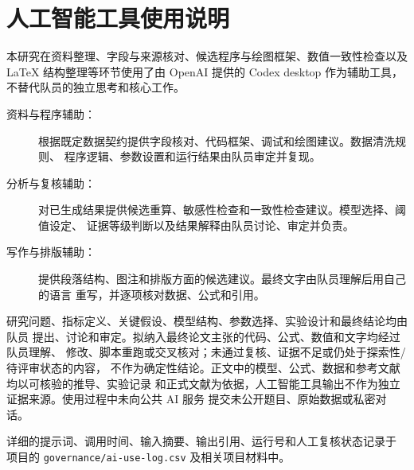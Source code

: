 \section{人工智能工具使用说明}
\label{app:ai-use}

本研究在资料整理、字段与来源核对、候选程序与绘图框架、数值一致性检查以及
\LaTeX{} 结构整理等环节使用了由 OpenAI 提供的 Codex desktop 作为辅助工具，
不替代队员的独立思考和核心工作。

\begin{description}
  \item[资料与程序辅助：]
  根据既定数据契约提供字段核对、代码框架、调试和绘图建议。数据清洗规则、
  程序逻辑、参数设置和运行结果由队员审定并复现。

  \item[分析与复核辅助：]
  对已生成结果提供候选重算、敏感性检查和一致性检查建议。模型选择、阈值设定、
  证据等级判断以及结果解释由队员讨论、审定并负责。

  \item[写作与排版辅助：]
  提供段落结构、图注和排版方面的候选建议。最终文字由队员理解后用自己的语言
  重写，并逐项核对数据、公式和引用。
\end{description}

研究问题、指标定义、关键假设、模型结构、参数选择、实验设计和最终结论均由队员
提出、讨论和审定。拟纳入最终论文主张的代码、公式、数值和文字均经过队员理解、
修改、脚本重跑或交叉核对；未通过复核、证据不足或仍处于探索性/待评审状态的内容，
不作为确定性结论。正文中的模型、公式、数据和参考文献均以可核验的推导、实验记录
和正式文献为依据，人工智能工具输出不作为独立证据来源。使用过程中未向公共 AI 服务
提交未公开题目、原始数据或私密对话。

\noindent 详细的提示词、调用时间、输入摘要、输出引用、运行号和人工复核状态记录于
项目的 \texttt{governance/ai-use-log.csv} 及相关项目材料中。
